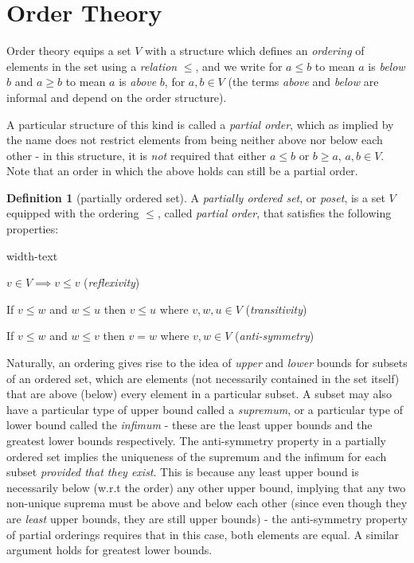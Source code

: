 \documentclass[letterpaper,10pt,oneside,onecolumn,reqno]{amsart}
\theoremstyle{definition}
\newtheorem{defn}{Definition}
\begin{document}
\section{Order Theory}

Order theory equips a set $V$ with a structure which defines an
\emph{ordering} of elements in the set using a \emph{relation} $\leq$,
and we write for $a \leq b$ to mean $a$ is \emph{below} $b$ and $a
\geq b$ to mean $a$ is \emph{above} $b$, for $a,b \in V$ (the terms
\emph{above} and \emph{below} are informal and depend on the order
structure).

A particular structure of this kind is called a \emph{partial order},
which as implied by the name does not restrict elements from being
neither above nor below each other - in this structure, it is
\emph{not} required that either $a \leq b$ or $b \geq a$, $a,b \in
V$. Note that an order in which the above holds can still be a partial
 order. 

\begin{framed}
  \begin{defn}[partially ordered set]\label{def:2}
    A \emph{partially ordered set}, or
    \emph{poset}, is a set $V$ equipped with the ordering
    $\leq$, called \emph{partial order}, that satisfies the following
    properties:

    \begin{deflist}{width-text}
    \item $v \in V \implies v \leq v$ (\emph{reflexivity})
    \item If $v \leq w$ and $w \leq u$ then $v \leq u$ where $v,w,u \in V$
      (\emph{transitivity})
    \item If $v \leq w$ and $w \leq v$ then $v = w$ where $v,w \in V$
      (\emph{anti-symmetry})
    \end{deflist}
  \end{defn}
\end{framed}

Naturally, an ordering gives rise to the idea of \emph{upper} and
\emph{lower} bounds for subsets of an ordered set, which are elements
(not necessarily contained in the set itself) that are above (below)
every element in a particular subset. A subset may also have a
particular type of upper bound called a \emph{supremum}, or a
particular type of lower bound called the \emph{infimum} - these are
the least upper bounds and the greatest lower bounds respectively. The
anti-symmetry property in a partially ordered set implies the
uniqueness of the supremum and the infimum for each subset
\emph{provided that they exist}. This is because any least upper bound
is necessarily below (w.r.t the order) any other upper bound, implying
that any two non-unique suprema must be above and below each other
(since even though they are \emph{least} upper bounds, they are still
upper bounds) - the anti-symmetry property of partial orderings
requires that in this case, both elements are equal. A similar
argument holds for greatest lower bounds.
\end{document}
